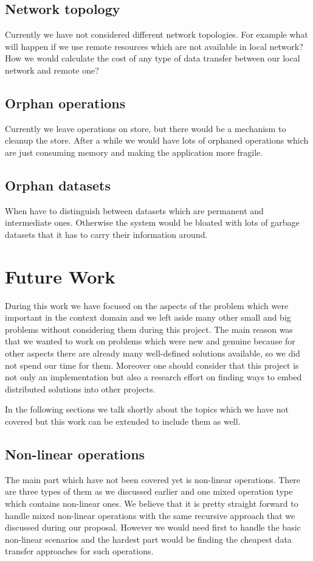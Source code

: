 \subsection{Network topology}
Currently we have not considered different network topologies. For example what will happen
if we use remote resources which are not available in local network? How we would calculate
the cost of any type of data transfer between our local network and remote one? 
\subsection{Orphan operations}
Currently we leave operations on store, but there would be a mechanism to cleanup the store.
After a while we would have lots of orphaned operations which are just consuming memory and
making the application more fragile.
\subsection{Orphan datasets}
When have to distinguish between datasets which are permanent and intermediate ones. Otherwise
the system would be bloated with lots of garbage datasets that it has to carry their information
around.  

\section{Future Work}
During this work we have focused on the aspects of the problem which were important in the context 
domain and we left aside many other small and big problems without considering them during this project. The main
reason was that we wanted to work on problems which were new and genuine
because for other aspects there are already many well-defined solutions
available, so we did not spend our time for them. Moreover one should 
consider that this project is not only an implementation but also a 
research effort on finding ways to embed distributed solutions into other projects.

In the following sections we talk shortly about the topics which we have
not covered but this work can be extended to include them as well.

\subsection{Non-linear operations}
The main part which have not been covered yet is non-linear operations. 
There are three types of them as we discussed earlier and one mixed operation type which contains non-linear ones.
We believe that it is pretty straight forward to handle mixed non-linear operations with the same recursive approach
that we discussed during our proposal. However we would need first to handle the basic non-linear scenarios and the 
hardest part would be finding the cheapest data transfer approaches for such operations. 

